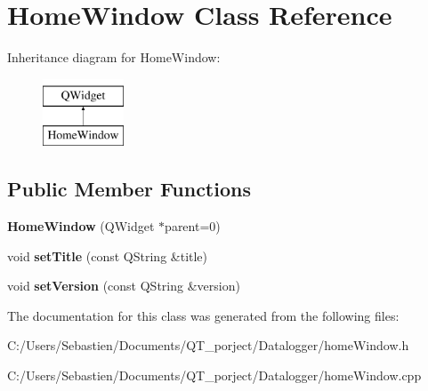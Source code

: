 \hypertarget{class_home_window}{}\section{Home\+Window Class Reference}
\label{class_home_window}
Inheritance diagram for Home\+Window\+:\begin{figure}[H]
\begin{center}
\leavevmode
\includegraphics[height=2.000000cm]{class_home_window}
\end{center}
\end{figure}
\subsection*{Public Member Functions}
\begin{DoxyCompactItemize}
\item 
\mbox{\label{class_home_window_a33f9ed05f73e54e47cdbf7a326efe1de}} 
{\bfseries Home\+Window} (Q\+Widget $\ast$parent=0)
\item 
\mbox{\label{class_home_window_ab795c5c12c6a6056d65346e329bedaa3}} 
void {\bfseries set\+Title} (const Q\+String \&title)
\item 
\mbox{\label{class_home_window_a0e3f13c0ded7687753424daa3021e0ee}} 
void {\bfseries set\+Version} (const Q\+String \&version)
\end{DoxyCompactItemize}


The documentation for this class was generated from the following files\+:\begin{DoxyCompactItemize}
\item 
C\+:/\+Users/\+Sebastien/\+Documents/\+Q\+T\+\_\+porject/\+Datalogger/home\+Window.\+h\item 
C\+:/\+Users/\+Sebastien/\+Documents/\+Q\+T\+\_\+porject/\+Datalogger/home\+Window.\+cpp\end{DoxyCompactItemize}
